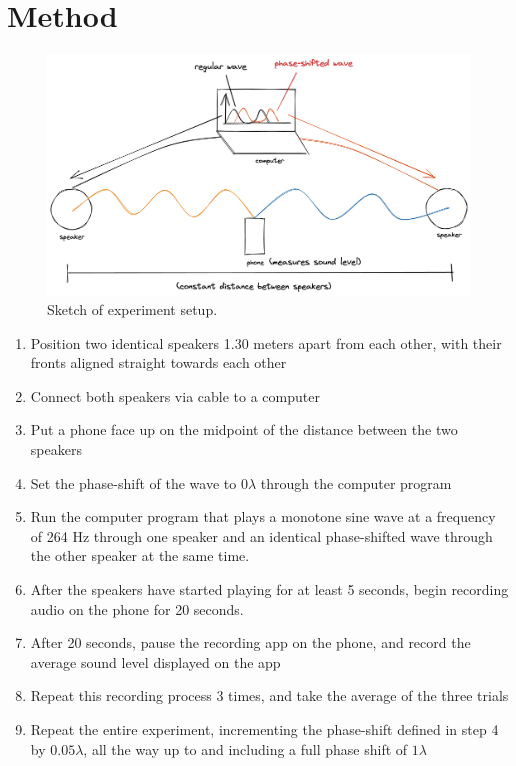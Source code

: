 \documentclass[index]{subfiles}
\begin{document}
\section{Method}

\begin{figure}[H]
    \centering
    \includegraphics[scale=0.24]{sound_diagram.png}
    \caption{Sketch of experiment setup.}
\end{figure}

\begin{enumerate}
    \item Position two identical speakers 1.30 meters apart from each other, with their fronts aligned straight towards each other
    \item Connect both speakers via cable to a computer
    \item Put a phone face up on the midpoint of the distance between the two speakers
    \item Set the phase-shift of the wave to \(0\lambda\) through the computer program
    \item Run the computer program that plays a monotone sine wave at a frequency of 264 Hz through one speaker and an identical phase-shifted wave through the other speaker at the same time.
    \item After the speakers have started playing for at least 5 seconds, begin recording audio on the phone for 20 seconds.
    \item After 20 seconds, pause the recording app on the phone, and record the average sound level displayed on the app
    \item Repeat this recording process 3 times, and take the average of the three trials
    \item Repeat the entire experiment, incrementing the phase-shift defined in step 4 by \(0.05\lambda\), all the way up to and including a full phase shift of \(1\lambda\)
\end{enumerate}
\end{document}
